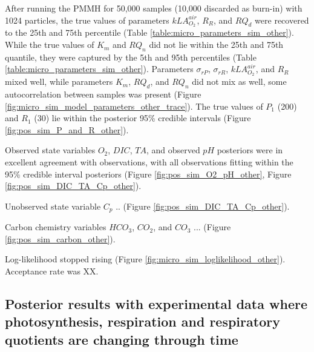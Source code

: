 \documentclass{ruthesis}
\begin{document}
After running the PMMH for 50,000 samples (10,000 discarded as burn-in) with 1024 particles, the true values of parameters $kLA_{O_2}^{air}$, $R_R$, and $RQ_d$ were recovered to the 25th and 75th percentile (Table \ref{table:micro_parameters_sim_other}). While the true values of $K_m$ and $RQ_n$ did not lie within the 25th and 75th quantile, they were captured by the 5th and 95th percentiles (Table \ref{table:micro_parameters_sim_other}). 
Parameters $\sigma_{rP}$, $\sigma_{rR}$, $kLA_{O_2}^{air}$, and $R_R$ mixed well, while parameters $K_m$, $RQ_d$, and $RQ_n$ did not mix as well, some autocorrelation between samples was present (Figure \ref{fig:micro_sim_model_parameters_other_trace}). The true values of $P_1$ (200) and $R_1$ (30) lie within the posterior 95\% credible intervals
(Figure \ref{fig:pos_sim_P_and_R_other}).

Observed state variables $O_2$, $DIC$, $TA$, and observed $pH$ posteriors were in excellent agreement with observations, with all observations fitting within the 95\% credible interval posteriors (Figure \ref{fig:pos_sim_O2_pH_other}, Figure \ref{fig:pos_sim_DIC_TA_Cp_other}).


Unobserved state variable $C_p$ .. (Figure \ref{fig:pos_sim_DIC_TA_Cp_other}).

Carbon chemistry variables $HCO_3$, $CO_2$, and $CO_3$ ... (Figure \ref{fig:pos_sim_carbon_other}).


Log-likelihood stopped rising (Figure \ref{fig:micro_sim_loglikelihood_other}).
Acceptance rate was XX.

\FloatBarrier
\subsection{Posterior results with experimental data where photosynthesis, respiration and respiratory quotients are changing through time}
\end{document}
